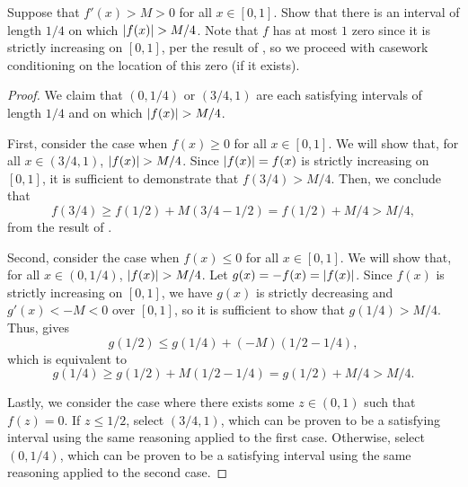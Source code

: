 \begin{problem}
  Suppose that $f'(x) > M > 0$ for all $x \in [0,1]$. Show that there is an
  interval of length $1/4$ on which $\left\lvert f(x) \right\rvert > M/4$. Note that $f$ has at
  most $1$ zero since it is strictly increasing on $[0, 1]$, per the result of
  , so we proceed with
  casework conditioning on the location of this zero (if it exists).

  \begin{proof}
    We claim that $(0, 1/4)$ or $(3/4, 1)$ are each satisfying intervals of
    length $1/4$ and on which $\left\lvert f(x) \right\rvert > M/4$.

    First, consider the case when $f(x) \geq 0$ for all $x \in [0, 1]$. We will show that, for all 
    $x \in (3/4, 1)$, $\left\lvert f(x) \right\rvert > M/4$. Since $\left\lvert f(x) \right\rvert = f(x)$ is strictly increasing on $[0, 1]$, 
    it is sufficient to demonstrate that $f(3/4) > M/4$. Then, we conclude that
    \[
      f(3/4) \geq f(1/2) + M(3/4 - 1/2) = f(1/2) + M/4 > M/4,
    \]
    from the result of .

    Second, consider the case when $f(x) \leq 0$ for all $x \in [0, 1]$. We
    will show that, for all $x \in (0, 1/4)$, $\left\lvert f(x) \right\rvert > M/4$.
    Let $g(x) = -f(x) = \left\lvert f(x) \right\rvert$. Since $f(x)$ is strictly increasing on $[0, 1]$, we
    have $g(x)$ is strictly decreasing and $g'(x) < -M < 0$ over $[0, 1]$, so
    it is sufficient to show that $g(1/4) > M/4$. Thus,  
     gives
    \[
      g(1/2) \leq g(1/4) + (-M)(1/2 - 1/4),
    \]
    which is equivalent to
    \[
      g(1/4) \geq g(1/2) + M(1/2 - 1/4) = g(1/2) + M/4 > M/4.
    \]

    Lastly, we consider the case where there exists some $z \in (0, 1)$ such
    that $f(z) = 0$. If $z \leq 1/2$, select $(3/4, 1)$, which can be proven to
    be a satisfying interval using the same reasoning applied to the first
    case. Otherwise, select $(0, 1/4)$, which can be proven to be a satisfying
    interval using the same reasoning applied to the second case.
  \end{proof}
\end{problem}

